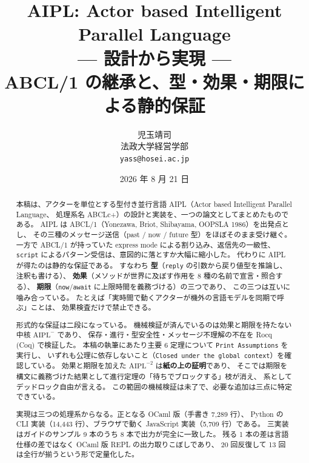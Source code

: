 \documentclass[11pt,a4paper]{ltjsarticle}
\title{\bfseries AIPL: Actor based Intelligent Parallel Language\\[2mm]
       \large --- 設計から実現 ---\\[1mm]
       \normalsize ABCL/1 の継承と、型・効果・期限による静的保証}
\author{児玉靖司\\\small 法政大学経営学部\\\small \texttt{yass@hosei.ac.jp}}
\date{2026 年 8 月 21 日}
\theoremstyle{definition}
\theoremstyle{remark}
\begin{document}
\maketitle

\begin{abstract}
本稿は、アクターを単位とする型付き並行言語 AIPL（Actor based Intelligent Parallel Language、
処理系名 ABCLc+）の設計と実装を、一つの論文としてまとめたものである。
AIPL は ABCL/1（Yonezawa, Briot, Shibayama, OOPSLA 1986）を出発点とし、
その三種のメッセージ送信（past / now / future 型）をほぼそのまま受け継ぐ。
一方で ABCL/1 が持っていた express mode による割り込み、返信先の一級性、
\texttt{script} によるパターン受信は、意図的に落とすか大幅に縮小した。
代わりに AIPL が得たのは静的な保証である。
すなわち \textbf{型}（\texttt{reply} の引数から戻り値型を推論し、注釈も書ける）、
\textbf{効果}（メソッドが世界に及ぼす作用を 8 種の名前で宣言・照合する）、
\textbf{期限}（\texttt{now}/\texttt{await} に上限時間を義務づける）の三つであり、
この三つは互いに噛み合っている。
たとえば「実時間で動くアクターが機外の言語モデルを同期で呼ぶ」ことは、
効果検査だけで禁止できる。

形式的な保証は二段になっている。
機械検証が済んでいるのは効果と期限を持たない中核 $\mathrm{AIPL}^{-}$ であり、
保存・進行・型安全性・メッセージ不理解の不在を Rocq (Coq) で検証した。
本稿の執筆にあたり主要 6 定理について \texttt{Print Assumptions} を実行し、
いずれも公理に依存しないこと（\texttt{Closed under the global context}）を確認している。
効果と期限を加えた $\mathrm{AIPL}^{-2}$ は\textbf{紙の上の証明}であり、
そこでは期限を構文に義務づけた結果として進行定理の「待ちでブロックする」枝が消え、
系としてデッドロック自由が言える。
この範囲の機械検証は未了で、必要な追加は三点に特定できている。

実現は三つの処理系からなる。正となる OCaml 版（手書き 7,289 行）、
Python の CLI 実装（14,443 行）、ブラウザで動く JavaScript 実装（5,709 行）である。
三実装はガイドのサンプル 9 本のうち 8 本で出力が完全に一致した。
残る 1 本の差は言語仕様の差ではなく OCaml 版 REPL の出力取りこぼしであり、
20 回反復して 13 回は全行が揃うという形で定量化した。


\end{abstract}
\end{document}
